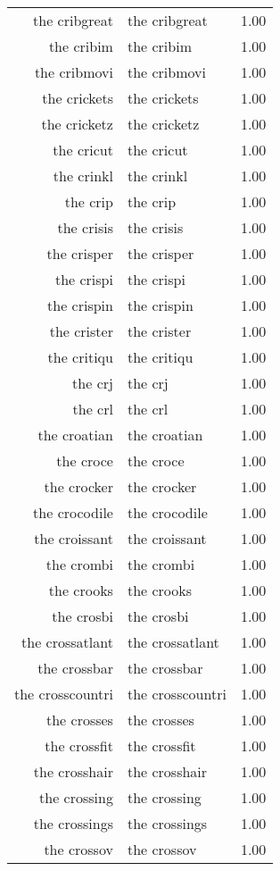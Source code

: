 \begin{table}[ht]
\begin{tabular}{rlr}
  the cribgreat & the cribgreat & 1.00 \\ 
  the cribim & the cribim & 1.00 \\ 
  the cribmovi & the cribmovi & 1.00 \\ 
  the crickets & the crickets & 1.00 \\ 
  the cricketz & the cricketz & 1.00 \\ 
  the cricut & the cricut & 1.00 \\ 
  the crinkl & the crinkl & 1.00 \\ 
  the crip & the crip & 1.00 \\ 
  the crisis & the crisis & 1.00 \\ 
  the crisper & the crisper & 1.00 \\ 
  the crispi & the crispi & 1.00 \\ 
  the crispin & the crispin & 1.00 \\ 
  the crister & the crister & 1.00 \\ 
  the critiqu & the critiqu & 1.00 \\ 
  the crj & the crj & 1.00 \\ 
  the crl & the crl & 1.00 \\ 
  the croatian & the croatian & 1.00 \\ 
  the croce & the croce & 1.00 \\ 
  the crocker & the crocker & 1.00 \\ 
  the crocodile & the crocodile & 1.00 \\ 
  the croissant & the croissant & 1.00 \\ 
  the crombi & the crombi & 1.00 \\ 
  the crooks & the crooks & 1.00 \\ 
  the crosbi & the crosbi & 1.00 \\ 
  the crossatlant & the crossatlant & 1.00 \\ 
  the crossbar & the crossbar & 1.00 \\ 
  the crosscountri & the crosscountri & 1.00 \\ 
  the crosses & the crosses & 1.00 \\ 
  the crossfit & the crossfit & 1.00 \\ 
  the crosshair & the crosshair & 1.00 \\ 
  the crossing & the crossing & 1.00 \\ 
  the crossings & the crossings & 1.00 \\ 
  the crossov & the crossov & 1.00 \\ 

\end{tabular}
\end{table}
